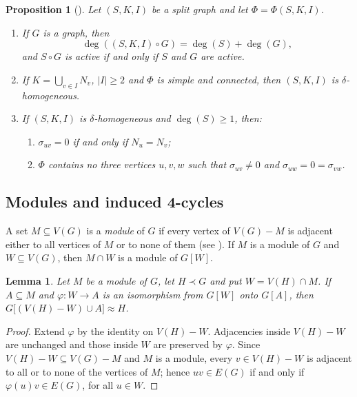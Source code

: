 \documentclass[11pt]{article}
\newtheorem{lemma}[lemma]{Lemma}
\newtheorem{proposition}[proposition]{Proposition}
\begin{document}
\begin{proposition}[\cite{pastine20252,pastine2025simple}]
	\label{hechos.previos}
	Let $(S,K,I)$ be a split graph and let $\Phi=\Phi(S,K,I)$.
	\begin{enumerate}
		\item If $G$ is a graph, then
		\[ \deg((S,K,I)\circ G)=\deg(S)+\deg(G), \]
		and $S\circ G$ is active if and only if $S$ and $G$ are active.
		
		\item If $K=\bigcup_{v\in I}N_v$, $|I|\geq 2$ and $\Phi$ is simple and connected, then $(S,K,I)$ is $\delta$-homogeneous.
		
		\item If $(S,K,I)$ is $\delta$-homogeneous and $\deg(S)\geq 1$, then:
		\begin{enumerate}
			\item $\sigma_{uv}=0$ if and only if $N_u=N_v$;
			\item $\Phi$ contains no three vertices $u,v,w$ such that $\sigma_{uv}\neq 0$ and $\sigma_{uw}=0=\sigma_{vw}$.
		\end{enumerate}
	\end{enumerate}
\end{proposition}


\subsection{Modules and induced 4-cycles}\label{sec_tools_C4}

A set $M\subseteq V(G)$ is a \emph{module} of $G$ if every vertex of
$V(G)- M$ is adjacent either to all vertices of $M$ or to none of
them (see \cite{gallai1967}). If $M$ is a module of $G$ and $W\subseteq V(G)$, then $M\cap W$ is a
module of $G[W]$.

\begin{lemma}
	\label{modulo.reemplazo}
	Let $M$ be a module of $G$, let $H\prec G$ and put $W=V(H)\cap M$. If
	$A\subseteq M$ and $\varphi\colon W\to A$ is an isomorphism from
	$G[W]$ onto $G[A]$, then $G\bigl[(V(H)-W)\cup A\bigr]\approx H$.
\end{lemma}

\begin{proof}
	Extend $\varphi$ by the identity on $V(H)-W$. Adjacencies inside
	$V(H)-W$ are unchanged and those inside $W$ are preserved by
	$\varphi$. Since $V(H)-W\subseteq V(G)-M$ and $M$ is a module, every
	$v\in V(H)-W$ is adjacent to all or to none of the vertices of $M$;
	hence $uv\in E(G)$ if and only if $\varphi(u)v\in E(G)$, for all
	$u\in W$.
\end{proof}
\end{document}
